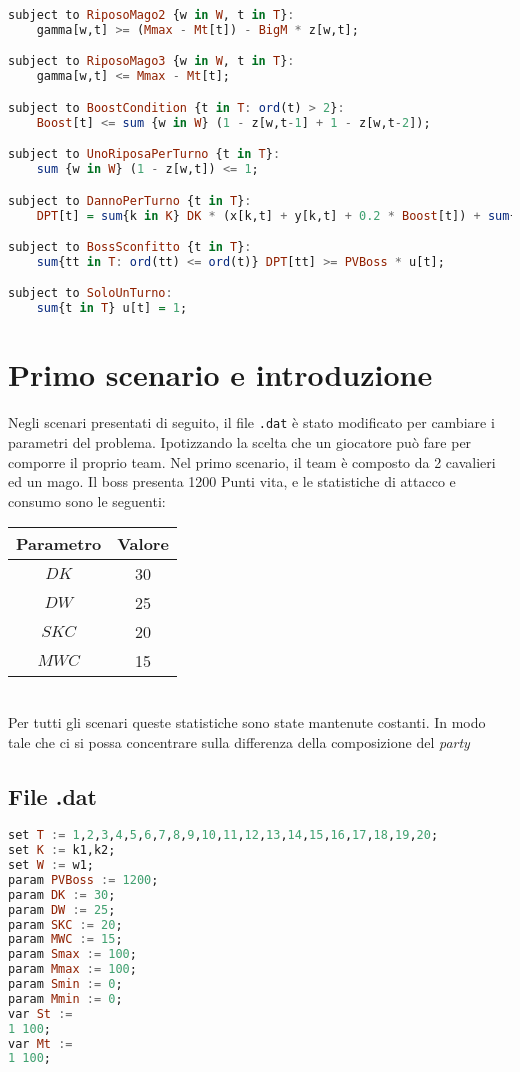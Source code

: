 \documentclass[12pt]{article}
\begin{document}
\begin{lstlisting}[language=haskell, frame=single, caption={Modello in Ampl}, captionpos=b, keywordstyle=\color{purple}]
subject to RiposoMago2 {w in W, t in T}:
    gamma[w,t] >= (Mmax - Mt[t]) - BigM * z[w,t];

subject to RiposoMago3 {w in W, t in T}:
    gamma[w,t] <= Mmax - Mt[t];

subject to BoostCondition {t in T: ord(t) > 2}:
    Boost[t] <= sum {w in W} (1 - z[w,t-1] + 1 - z[w,t-2]);

subject to UnoRiposaPerTurno {t in T}:
    sum {w in W} (1 - z[w,t]) <= 1;

subject to DannoPerTurno {t in T}:
    DPT[t] = sum{k in K} DK * (x[k,t] + y[k,t] + 0.2 * Boost[t]) + sum{w in W} z[w,t] * DW;

subject to BossSconfitto {t in T}:
    sum{tt in T: ord(tt) <= ord(t)} DPT[tt] >= PVBoss * u[t];

subject to SoloUnTurno:
    sum{t in T} u[t] = 1;
\end{lstlisting}

\section{Primo scenario e introduzione}
Negli scenari presentati di seguito, il file \texttt{.dat} è stato modificato per cambiare i parametri del problema. Ipotizzando la scelta che un giocatore può fare per comporre il proprio team.
Nel primo scenario, il team è composto da 2 cavalieri ed un mago. Il boss presenta 1200 Punti vita, e le statistiche di attacco e consumo sono le seguenti:
\begin{table}[h!]
    \centering
    \begin{tabular}{|c|c|}
        \hline
        \textbf{Parametro} & \textbf{Valore} \\
        \hline
        $DK$ & 30 \\
        $DW$ & 25 \\
        $SKC$ & 20 \\
        $MWC$ & 15 \\
        \hline
    \end{tabular}
\end{table}\\
Per tutti gli scenari queste statistiche sono state mantenute costanti. In modo tale che ci si possa concentrare sulla differenza della composizione del \textit{party}\\
\subsection{File .dat}
\begin{lstlisting}[language=haskell, frame=single, captionpos=b, keywordstyle=\color{purple}]  
set T := 1,2,3,4,5,6,7,8,9,10,11,12,13,14,15,16,17,18,19,20;
set K := k1,k2; 
set W := w1;
param PVBoss := 1200;
param DK := 30;
param DW := 25;
param SKC := 20;
param MWC := 15;    
param Smax := 100;
param Mmax := 100;
param Smin := 0;
param Mmin := 0;  
var St :=
1 100;
var Mt :=
1 100;
\end{lstlisting}
\end{document}
